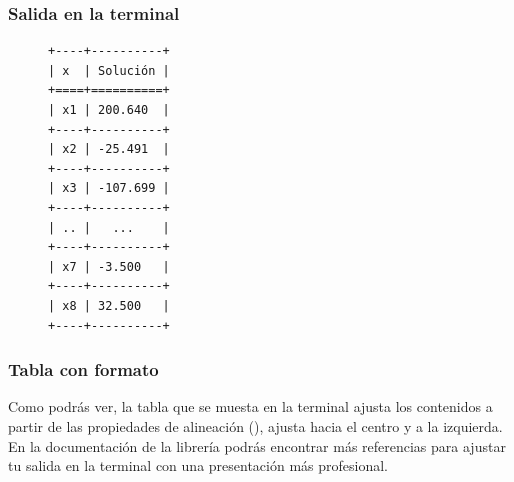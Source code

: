 \begin{frame}
\frametitle{Salida en la terminal}
\fontsize{12}{12}\selectfont
\begin{figure}
\centering
\begin{BVerbatim}
+----+----------+
| x  | Solución |
+====+==========+
| x1 | 200.640  |
+----+----------+
| x2 | -25.491  |
+----+----------+
| x3 | -107.699 |
+----+----------+
| .. |   ...    |
+----+----------+
| x7 | -3.500   |
+----+----------+
| x8 | 32.500   |
+----+----------+
\end{BVerbatim}
\end{figure}
\end{frame}
\begin{frame}
\frametitle{Tabla con formato}
Como podrás ver, la tabla que se muesta en la terminal ajusta los contenidos a partir de las propiedades de alineación (\funcionazul{['c', 'l']}), ajusta hacia el centro y a la izquierda.
\\
\bigskip
En la documentación de la librería podrás encontrar más referencias para ajustar tu salida en la terminal con una presentación más profesional.
\end{frame}
